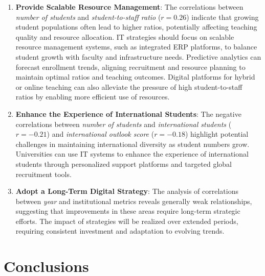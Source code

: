 \documentclass[conference]{IEEEtran}
\begin{document}
\begin{enumerate}
	\item \textbf{Provide Scalable Resource Management}: The correlations between \textit{number of students} and \textit{student-to-staff ratio} (\(r = 0.26\)) indicate that growing student populations often lead to higher ratios, potentially affecting teaching quality and resource allocation. IT strategies should focus on scalable resource management systems, such as integrated ERP platforms, to balance student growth with faculty and infrastructure needs. Predictive analytics can forecast enrollment trends, aligning recruitment and resource planning to maintain optimal ratios and teaching outcomes. Digital platforms for hybrid or online teaching can also alleviate the pressure of high student-to-staff ratios by enabling more efficient use of resources.
	
	\item \textbf{Enhance the Experience of International Students}: The negative correlations between \textit{number of students} and \textit{international students} (\(r = -0.21\)) and \textit{international outlook score} (\(r = -0.18\)) highlight potential challenges in maintaining international diversity as student numbers grow. Universities can use IT systems to enhance the experience of international students through personalized support platforms and targeted global recruitment tools.
	
	\item \textbf{Adopt a Long-Term Digital Strategy}: The analysis of correlations between \textit{year} and institutional metrics reveals generally weak relationships, suggesting that improvements in these areas require long-term strategic efforts. The impact of strategies will be realized over extended periods, requiring consistent investment and adaptation to evolving trends.
\end{enumerate}

\section{Conclusions}
\end{document}
